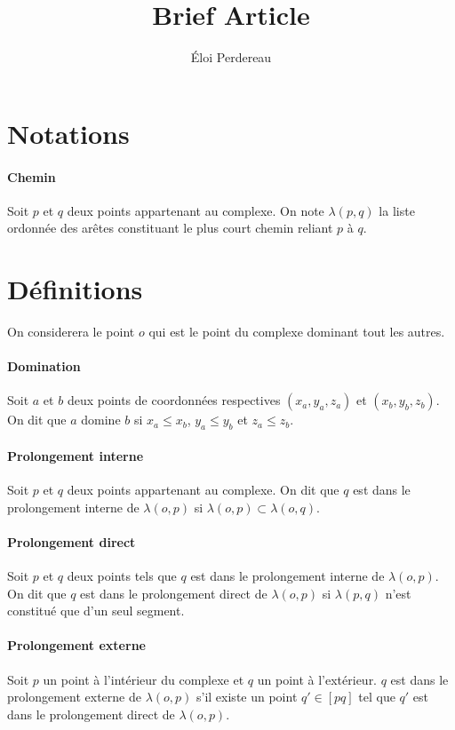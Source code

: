 \documentclass[11pt]{article} %
\title{Brief Article}
\author{\'Eloi Perdereau}
\begin{document}
\maketitle

\section{Notations}

\paragraph{Chemin}
Soit $p$ et $q$ deux points appartenant au complexe. On note $\lambda (p, q)$ la liste ordonnée des arêtes constituant le plus court chemin reliant $p$ à $q$.

\section{Définitions}

On considerera le point $o$ qui est le point du complexe dominant tout les autres.

\paragraph{Domination}
Soit $a$ et $b$ deux points de coordonnées respectives $(x_a, y_a, z_a)$ et $(x_b, y_b, z_b)$. On dit que $a$ domine $b$ si $x_a \leq x_b$, $y_a \leq y_b$ et $z_a \leq z_b$.

\paragraph{Prolongement interne}
Soit $p$ et $q$ deux points appartenant au complexe. On dit que $q$ est dans le prolongement interne de $\lambda (o, p)$ si $\lambda (o, p) \subset \lambda (o, q)$.

\paragraph{Prolongement direct}
Soit $p$ et $q$ deux points tels que $q$ est dans le prolongement interne de $\lambda (o, p)$. On dit que $q$ est dans le prolongement direct de $\lambda (o, p)$ si $\lambda (p, q)$ n'est constitué que d'un seul segment.

\paragraph{Prolongement externe}
Soit $p$ un point à l'intérieur du complexe et $q$ un point à l'extérieur. $q$ est dans le prolongement externe de $\lambda (o, p)$ s'il existe un point $q' \in [pq]$ tel que $q'$ est dans le prolongement direct de $\lambda (o, p)$.
\end{document}
